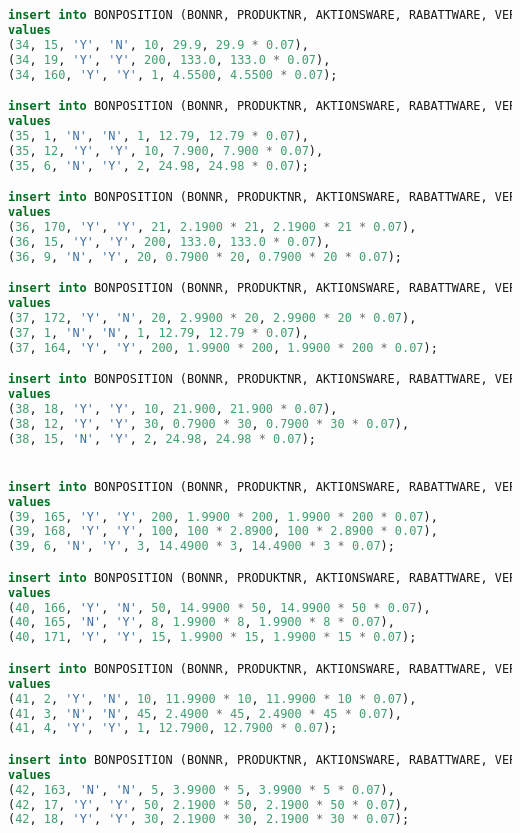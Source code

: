 \begin{lstlisting}[language=SQL]
insert into BONPOSITION (BONNR, PRODUKTNR, AKTIONSWARE, RABATTWARE, VERKAUFSMENGE, VERKAUFSPREIS, MWST)
values
(34, 15, 'Y', 'N', 10, 29.9, 29.9 * 0.07),
(34, 19, 'Y', 'Y', 200, 133.0, 133.0 * 0.07),
(34, 160, 'Y', 'Y', 1, 4.5500, 4.5500 * 0.07);

insert into BONPOSITION (BONNR, PRODUKTNR, AKTIONSWARE, RABATTWARE, VERKAUFSMENGE, VERKAUFSPREIS, MWST)
values
(35, 1, 'N', 'N', 1, 12.79, 12.79 * 0.07),
(35, 12, 'Y', 'Y', 10, 7.900, 7.900 * 0.07),
(35, 6, 'N', 'Y', 2, 24.98, 24.98 * 0.07);

insert into BONPOSITION (BONNR, PRODUKTNR, AKTIONSWARE, RABATTWARE, VERKAUFSMENGE, VERKAUFSPREIS, MWST)
values
(36, 170, 'Y', 'Y', 21, 2.1900 * 21, 2.1900 * 21 * 0.07),
(36, 15, 'Y', 'Y', 200, 133.0, 133.0 * 0.07),
(36, 9, 'N', 'Y', 20, 0.7900 * 20, 0.7900 * 20 * 0.07);

insert into BONPOSITION (BONNR, PRODUKTNR, AKTIONSWARE, RABATTWARE, VERKAUFSMENGE, VERKAUFSPREIS, MWST)
values
(37, 172, 'Y', 'N', 20, 2.9900 * 20, 2.9900 * 20 * 0.07),
(37, 1, 'N', 'N', 1, 12.79, 12.79 * 0.07),
(37, 164, 'Y', 'Y', 200, 1.9900 * 200, 1.9900 * 200 * 0.07);

insert into BONPOSITION (BONNR, PRODUKTNR, AKTIONSWARE, RABATTWARE, VERKAUFSMENGE, VERKAUFSPREIS, MWST)
values
(38, 18, 'Y', 'Y', 10, 21.900, 21.900 * 0.07),
(38, 12, 'Y', 'Y', 30, 0.7900 * 30, 0.7900 * 30 * 0.07),
(38, 15, 'N', 'Y', 2, 24.98, 24.98 * 0.07);


insert into BONPOSITION (BONNR, PRODUKTNR, AKTIONSWARE, RABATTWARE, VERKAUFSMENGE, VERKAUFSPREIS, MWST)
values
(39, 165, 'Y', 'Y', 200, 1.9900 * 200, 1.9900 * 200 * 0.07),
(39, 168, 'Y', 'Y', 100, 100 * 2.8900, 100 * 2.8900 * 0.07),
(39, 6, 'N', 'Y', 3, 14.4900 * 3, 14.4900 * 3 * 0.07);

insert into BONPOSITION (BONNR, PRODUKTNR, AKTIONSWARE, RABATTWARE, VERKAUFSMENGE, VERKAUFSPREIS, MWST)
values
(40, 166, 'Y', 'N', 50, 14.9900 * 50, 14.9900 * 50 * 0.07),
(40, 165, 'N', 'Y', 8, 1.9900 * 8, 1.9900 * 8 * 0.07),
(40, 171, 'Y', 'Y', 15, 1.9900 * 15, 1.9900 * 15 * 0.07);

insert into BONPOSITION (BONNR, PRODUKTNR, AKTIONSWARE, RABATTWARE, VERKAUFSMENGE, VERKAUFSPREIS, MWST)
values
(41, 2, 'Y', 'N', 10, 11.9900 * 10, 11.9900 * 10 * 0.07),
(41, 3, 'N', 'N', 45, 2.4900 * 45, 2.4900 * 45 * 0.07),
(41, 4, 'Y', 'Y', 1, 12.7900, 12.7900 * 0.07);

insert into BONPOSITION (BONNR, PRODUKTNR, AKTIONSWARE, RABATTWARE, VERKAUFSMENGE, VERKAUFSPREIS, MWST)
values
(42, 163, 'N', 'N', 5, 3.9900 * 5, 3.9900 * 5 * 0.07),
(42, 17, 'Y', 'Y', 50, 2.1900 * 50, 2.1900 * 50 * 0.07),
(42, 18, 'Y', 'Y', 30, 2.1900 * 30, 2.1900 * 30 * 0.07);


\end{lstlisting}
